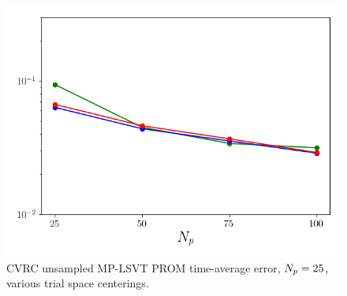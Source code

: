 \begin{figure}
\begin{minipage}{0.32\linewidth}
		\includegraphics[width=0.99\linewidth]{Chapters/BestPractices/Images/errVsModes_centScale_centMean_Average_errorRaw.png}
	\end{minipage}
	\caption{\label{fig:centScaleError}CVRC unsampled MP-LSVT PROM time-average error, $N_p = 25$, various trial space centerings.}
\end{figure}


